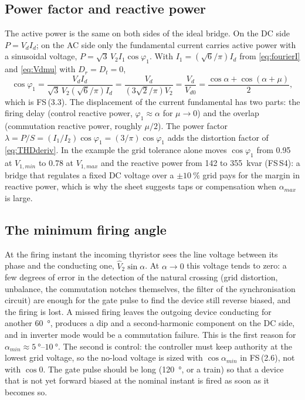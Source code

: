 \documentclass[10pt,a4paper]{scrartcl}
\newcommand{\Vdo}{V_{d0}}
\newcommand{\Vd}{V_{d}}
\newcommand{\Id}{I_{d}}
\newcommand{\Vll}{V_{2}}
\newcommand{\Dr}{D_{r}}
\newcommand{\Dt}{D_{t}}
\newcommand{\fs}[1]{\textsf{FS}\,(#1)}
\newcommand{\fsS}[1]{\textsf{FS}\,#1}
\begin{document}
\subsection{Power factor and reactive power}\label{sec:pf}
The active power is the same on both sides of the ideal bridge. On the DC side $P = \Vd\Id$; on the AC side only the fundamental current carries active power with a sinusoidal voltage, $P = \sqrt3\,\Vll I_1\cos\varphi_1$. With $I_1 = (\sqrt6/\pi)\Id$ from \eqref{eq:fourierI} and \eqref{eq:Vdmu} with $\Dr = \Dt = 0$,
\begin{equation}
\cos\varphi_1 = \frac{\Vd\Id}{\sqrt3\,\Vll(\sqrt6/\pi)\Id} = \frac{\Vd}{(3\sqrt2/\pi)\Vll} = \frac{\Vd}{\Vdo} = \frac{\cos\alpha+\cos(\alpha+\mu)}{2} ,
\label{eq:cosphi}
\end{equation}
which is \fs{3.3}. The displacement of the current fundamental has two parts: the firing delay (control reactive power, $\varphi_1\approx\alpha$ for $\mu\to0$) and the overlap (commutation reactive power, roughly $\mu/2$). The power factor $\lambda = P/S = (I_1/I_2)\cos\varphi_1 = (3/\pi)\cos\varphi_1$ adds the distortion factor of \eqref{eq:THDderiv}. In the example the grid tolerance alone moves $\cos\varphi_1$ from 0.95 at $V_{1,min}$ to 0.78 at $V_{1,max}$ and the reactive power from 142 to \SI{355}{kvar} (\fsS{S4}): a bridge that regulates a fixed DC voltage over a $\pm\SI{10}{\percent}$ grid pays for the margin in reactive power, which is why the sheet suggests taps or compensation when $\alpha_{max}$ is large.

\subsection{The minimum firing angle}\label{sec:amin}
At the firing instant the incoming thyristor sees the line voltage between its phase and the conducting one, $\hat V_2\sin\alpha$. At $\alpha\to0$ this voltage tends to zero: a few degrees of error in the detection of the natural crossing (grid distortion, unbalance, the commutation notches themselves, the filter of the synchronisation circuit) are enough for the gate pulse to find the device still reverse biased, and the firing is lost. A missed firing leaves the outgoing device conducting for another \SI{60}{\degree}, produces a dip and a second-harmonic component on the DC side, and in inverter mode would be a commutation failure. This is the first reason for $\alpha_{min}\approx\SIrange{5}{10}{\degree}$. The second is control: the controller must keep authority at the lowest grid voltage, so the no-load voltage is sized with $\cos\alpha_{min}$ in \fs{2.6}, not with $\cos0$. The gate pulse should be long (\SI{120}{\degree}, or a train) so that a device that is not yet forward biased at the nominal instant is fired as soon as it becomes so.
\end{document}

